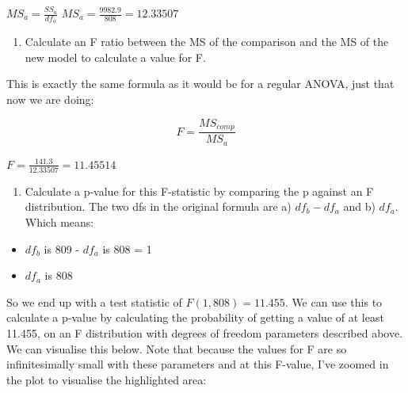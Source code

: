 \documentclass[
]{book}
\providecommand{\tightlist}{%
  \setlength{\itemsep}{0pt}\setlength{\parskip}{0pt}}
\begin{document}
\(MS_a = \frac{SS_{a}}{df_{a}}\)
\(MS_a = \frac{9982.9}{808} = 12.33507\)

\begin{enumerate}
\def\labelenumi{\arabic{enumi}.}
\setcounter{enumi}{4}
\tightlist
\item
  Calculate an F ratio between the MS of the comparison and the MS of the new model to calculate a value for F.
\end{enumerate}

This is exactly the same formula as it would be for a regular ANOVA, just that now we are doing:

\[
F = \frac{MS_{comp}}{MS_{a}}
\]

\(F = \frac{141.3}{12.33507} = 11.45514\)

\begin{enumerate}
\def\labelenumi{\arabic{enumi}.}
\setcounter{enumi}{5}
\tightlist
\item
  Calculate a p-value for this F-statistic by comparing the p against an F distribution. The two dfs in the original formula are a) \(df_b - df_a\) and b) \(df_a\). Which means:
\end{enumerate}

\begin{itemize}
\tightlist
\item
  \(df_b\) is 809 - \(df_a\) is 808 = 1
\item
  \(df_a\) is 808
\end{itemize}

So we end up with a test statistic of \(F(1, 808) = 11.455\). We can use this to calculate a p-value by calculating the probability of getting a value of at least 11.455, on an F distribution with degrees of freedom parameters described above. We can visualise this below. Note that because the values for F are so infinitesimally small with these parameters and at this F-value, I've zoomed in the plot to visualise the highlighted area:
\end{document}
